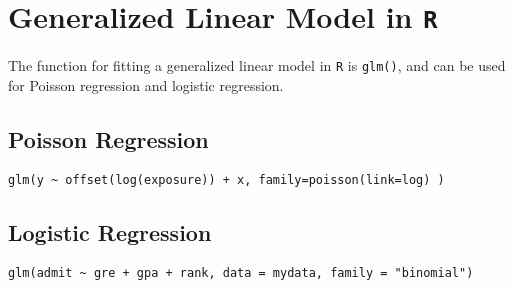 \documentclass[11pt]{article} %
\begin{document}
\section{Generalized Linear Model in \texttt{R}}
The function for fitting a generalized linear model in \texttt{R} is \texttt{glm()}, and can be used for Poisson regression and logistic regression.

\subsection{Poisson Regression}


\begin{framed}
\begin{verbatim}
glm(y ~ offset(log(exposure)) + x, family=poisson(link=log) )
\end{verbatim}
\end{framed}
\subsection{Logistic Regression}
\begin{framed}
\begin{verbatim}
glm(admit ~ gre + gpa + rank, data = mydata, family = "binomial")
\end{verbatim}
\end{framed}
\end{document}
